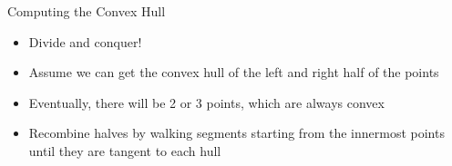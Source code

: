 \begin{frame}{Computing the Convex Hull}
	\begin{itemize}
		\item Divide and conquer!
		\item Assume we can get the convex hull of the left and right half of the points
		\item Eventually, there will be 2 or 3 points, which are always convex
		\item Recombine halves by walking segments starting from the innermost points until they are tangent to each hull
	\end{itemize}
	
\end{frame}
